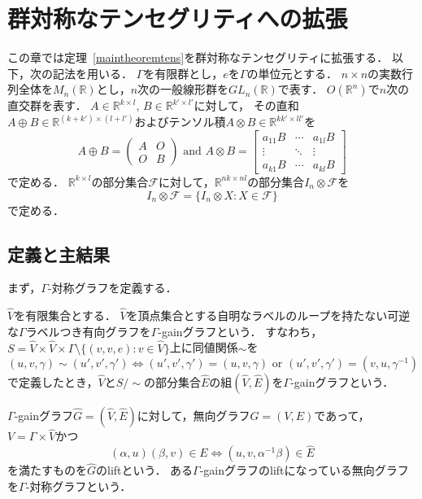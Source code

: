 \documentclass[11pt]{article}
\theoremstyle{definition}
\begin{document}
\section{群対称なテンセグリティへの拡張}
    この章では定理~\ref{maintheoremtens}を群対称なテンセグリティに拡張する．
    以下，次の記法を用いる．
    $\Gamma$を有限群とし，$e$を$\Gamma$の単位元とする．
    $n \times n$の実数行列全体を$M_n(\mathbb{R})$とし，$n$次の一般線形群を$GL_n(\mathbb{R})$で表す．
    $O(\mathbb{R}^n)$で$n$次の直交群を表す．
    $A \in \mathbb{R}^{k \times l}$, $B \in \mathbb{R}^{k' \times l'}$に対して，
    その直和$A \oplus B \in \mathbb{R}^{(k+k')\times (l+l')}$およびテンソル積$A \otimes B \in \mathbb{R}^{kk' \times ll'}$を
    \[
        A \oplus B =
        \begin{pmatrix}
        A & O \\
        O & B 
        \end{pmatrix} 
    \text{ and }
        A \otimes B =
        \begin{bmatrix} 
            a_{11}B & \cdots & a_{1l}B \\
            \vdots & \ddots & \vdots \\
            a_{k1}B & \cdots & a_{kl}B
        \end{bmatrix}
    \]
    で定める．
    $\mathbb{R}^{k \times l}$の部分集合$\mathcal{F}$に対して，$\mathbb{R}^{nk \times nl}$の部分集合$I_n \otimes \mathcal{F}$を
    \[
        I_n \otimes \mathcal{F} = \{ I_n \otimes X : X \in \mathcal{F} \}
    \]
    で定める．
    
\subsection{定義と主結果}
    まず，$\Gamma$-対称グラフを定義する．
    
    $\hat{V}$を有限集合とする．
    $\hat{V}$を頂点集合とする自明なラベルのループを持たない可逆な$\Gamma$ラベルつき有向グラフを$\Gamma$-gainグラフという．
    すなわち，$S=\hat{V} \times \hat{V} \times \Gamma \setminus \{(v,v,e) : v \in \hat{V}\}$上に同値関係$\sim$を
    \[
    (u,v,\gamma) \sim (u',v',\gamma') \Longleftrightarrow (u',v',\gamma') = (u,v,\gamma) \text{ or } (u',v',\gamma')=(v,u,\gamma^{-1}) 
    \]
    で定義したとき，$\hat{V}$と$S / \sim$の部分集合$\hat{E}$の組$(\hat{V},\hat{E})$を$\Gamma$-gainグラフという．
    
    $\Gamma$-gainグラフ$\hat{G}=(\hat{V},\hat{E})$に対して，無向グラフ$G=(V,E)$であって，$V=\Gamma \times \hat{V}$かつ
    \[
        (\alpha,u)(\beta,v) \in E \Longleftrightarrow (u,v,\alpha^{-1}\beta) \in \hat{E}   
    \]
    を満たすものを$\hat{G}$のliftという．
    ある$\Gamma$-gainグラフのliftになっている無向グラフを$\Gamma$-対称グラフという．
    
\end{document}
